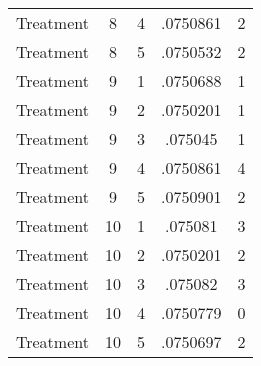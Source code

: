 \begin{tabular}{l*{4}{c}}
Treatment           &           8&           4&    .0750861&           2\\
Treatment           &           8&           5&    .0750532&           2\\
Treatment           &           9&           1&    .0750688&           1\\
Treatment           &           9&           2&    .0750201&           1\\
Treatment           &           9&           3&     .075045&           1\\
Treatment           &           9&           4&    .0750861&           4\\
Treatment           &           9&           5&    .0750901&           2\\
Treatment           &          10&           1&     .075081&           3\\
Treatment           &          10&           2&    .0750201&           2\\
Treatment           &          10&           3&     .075082&           3\\
Treatment           &          10&           4&    .0750779&           0\\
Treatment           &          10&           5&    .0750697&           2\\
\hline\hline
\end{tabular}
